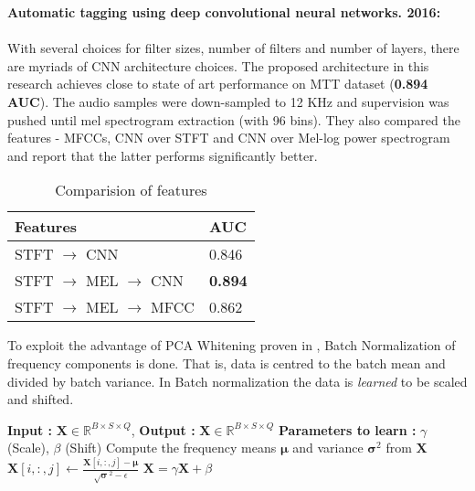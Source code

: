 \noindent \textbf{Automatic tagging using deep convolutional neural networks. 2016\cite{choi_cnn}:}\\
\\
\noindent With several choices for filter sizes, number of filters and number of layers, there are myriads of CNN  architecture choices. The proposed architecture in this research achieves close to state of art performance on MTT dataset (\textbf{0.894 AUC}). The audio samples were down-sampled to 12 KHz and supervision was pushed until mel spectrogram extraction (with 96 bins). They also compared the features - MFCCs, CNN over STFT and CNN over Mel-log power spectrogram and report that the latter performs significantly better. 
\begin{table}[H]
\centering
    \begin{tabular}{ | p{5cm} | l |}
    \hline
    \textbf{Features} & \textbf{AUC} \\ \hline
    STFT $\rightarrow$ CNN &  0.846\\ \hline
    STFT $\rightarrow$ MEL $\rightarrow$ CNN &  \textbf{0.894}\\ \hline
    STFT $\rightarrow$ MEL $\rightarrow$ MFCC &  0.862 \\ \hline
    \hline
    \end{tabular}
\caption{Comparision of features}
\end{table}
    
\noindent To exploit the advantage of PCA Whitening proven in \cite{MultiScale}\cite{featurelearn1}, Batch Normalization of frequency components is done. That is, data is centred to the batch mean and divided by batch variance. In Batch normalization the data is \textit{learned} to be scaled and shifted.
\begin{algorithm}
  \caption{$\textbf{\^{X}}$ = $BatchNorm$($\textbf{X}$) }\label{Batch norm}
  \begin{algorithmic}[1]
    \Statex \textbf{Input :} $\textbf{X} \in \mathbb{R}^{B \times S \times Q}$, 
    \Statex \textbf{Output :} $\textbf{\^X} \in \mathbb{R}^{B \times S \times Q}$ 
    \Statex \textbf{Parameters to learn :} $\gamma$ (Scale), $\beta$ (Shift) 
    \State Compute the frequency means $\bm{\mu}$ and variance $\bm{\sigma}^{2}$ from $\textbf{X}$ 
       \State $\textbf{X}[i,:,j] \leftarrow \frac{\textbf{X}[i,:,j] - \bm{\mu}}{\sqrt{\bm{\sigma}}^{2} - \epsilon}$
      \EndFor
     \EndFor
     \State $\textbf{\^X} = \gamma\textbf{X} + \beta$
  \end{algorithmic}
\end{algorithm}
\FloatBarrier

